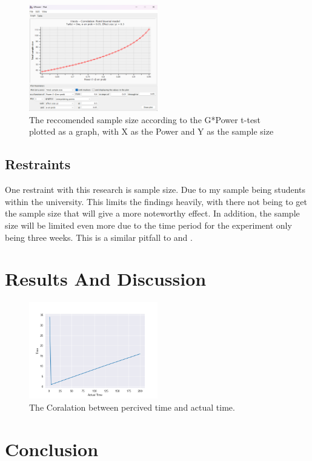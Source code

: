 \documentclass[conference]{IEEEtran}
\begin{document}
\begin{figure}[H]
\includegraphics[width = 0.5\textwidth]{fig2(2)}
\caption{The reccomended sample size according to the G*Power t-test plotted as a graph, with X as the Power and Y as the sample size}
\end{figure}

\subsection {Restraints}
One restraint with this research is sample size. Due to my sample being students within the university. This limits the findings heavily, with there not being to get the sample size that will give a more noteworthy effect. In addition, the sample size will be limited even more due to the time period for the experiment only being three weeks. This is a similar pitfall to \cite{Naaj2021} and \cite{Ruqeyya2022}.\\

\section{Results And Discussion}
\begin{figure}[H]
\includegraphics[width = 0.5\textwidth]{Graph1}
\caption{The Coralation between percived time and actual time.}
\end{figure}
\section{Conclusion}




\end{document}
